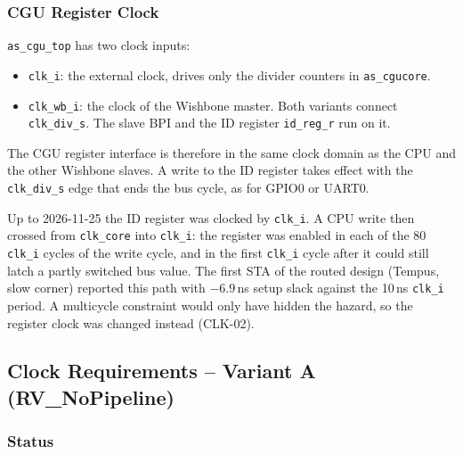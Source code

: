 \subsubsection{CGU Register Clock}
\label{subsubsec:cguRegClock}

\texttt{as\_cgu\_top} has two clock inputs:
\begin{itemize}
  \item \texttt{clk\_i}: the external clock, drives only the divider
    counters in \texttt{as\_cgucore}.
  \item \texttt{clk\_wb\_i}: the clock of the Wishbone master. Both
    variants connect \texttt{clk\_div\_s}. The slave BPI and the ID
    register \texttt{id\_reg\_r} run on it.
\end{itemize}
The CGU register interface is therefore in the same clock domain as the CPU
and the other Wishbone slaves. A write to the ID register takes effect with
the \texttt{clk\_div\_s} edge that ends the bus cycle, as for GPIO0 or
UART0.

Up to 2026-11-25 the ID register was clocked by \texttt{clk\_i}. A CPU
write then crossed from \texttt{clk\_core} into \texttt{clk\_i}: the
register was enabled in each of the 80 \texttt{clk\_i} cycles of the write
cycle, and in the first \texttt{clk\_i} cycle after it could still latch a
partly switched bus value. The first STA of the routed design (Tempus,
slow corner) reported this path with $-6.9$\,ns setup slack against the
10\,ns \texttt{clk\_i} period. A multicycle constraint would only have
hidden the hazard, so the register clock was changed instead (CLK-02).

\subsection{Clock Requirements -- Variant A (RV\_NoPipeline)}
\label{subsec:clockReqNoPipeline}

\subsubsection{Status}

